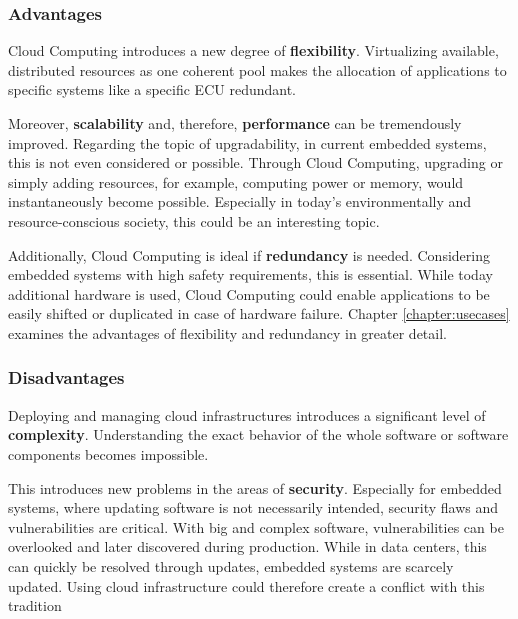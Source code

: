            
            \subsubsection{Advantages}
            
                \noindent Cloud Computing introduces a new degree of \textbf{flexibility}. 
                Virtualizing available, distributed resources as one coherent pool makes the allocation of applications to specific systems like a specific \ac{ECU} redundant.
                
                \noindent Moreover, \textbf{scalability} and, therefore, \textbf{performance} can be tremendously improved.
                Regarding the topic of upgradability, in current embedded systems, this is not even considered or possible. 
                Through Cloud Computing, upgrading or simply adding resources, for example, computing power or memory, would instantaneously become possible. 
                Especially in today's environmentally and resource-conscious society, this could be an interesting topic.
                
                \newpage
                \noindent Additionally, Cloud Computing is ideal if \textbf{redundancy} is needed.
                Considering embedded systems with high safety requirements, this is essential.
                While today additional hardware is used, Cloud Computing could enable applications to be easily shifted or duplicated in case of hardware failure.
                Chapter \ref{chapter:usecases} examines the advantages of flexibility and redundancy in greater detail.
            
             
            \subsubsection{Disadvantages}
            
                \noindent Deploying and managing cloud infrastructures introduces a significant level of \textbf{complexity}.
                Understanding the exact behavior of the whole software or software components becomes impossible.
                
                \noindent This introduces new problems in the areas of \textbf{security}.
                Especially for embedded systems, where updating software is not necessarily intended, security flaws and vulnerabilities are critical.
                With big and complex software, vulnerabilities can be overlooked and later discovered during production.
                While in data centers, this can quickly be resolved through updates, embedded systems are scarcely updated.
                Using cloud infrastructure could therefore create a conflict with this tradition
                
